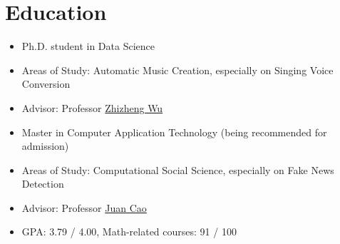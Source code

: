 \documentclass{resume}
\begin{document}




\section{Education}
{
  \small
  \begin{itemize}
    \item Ph.D. student in Data Science
    \item Areas of Study: Automatic Music Creation, especially on Singing Voice
          Conversion
    \item Advisor: Professor
          \href{https://scholar.google.com/citations?user=K6zhweAAAAAJ&hl=en}{Zhizheng
            Wu}
  \end{itemize}
}

{
  \small
  \begin{itemize}
    \item Master in Computer Application Technology (being recommended for admission)
    \item Areas of Study: Computational Social Science, especially on Fake News Detection
    \item Advisor: Professor
          \href{https://scholar.google.com/citations?user=fSBdNg0AAAAJ&hl=zh-CN}{Juan
            Cao}
    \item GPA: 3.79 / 4.00, Math-related courses: 91 / 100
  \end{itemize}
}
\end{document}
